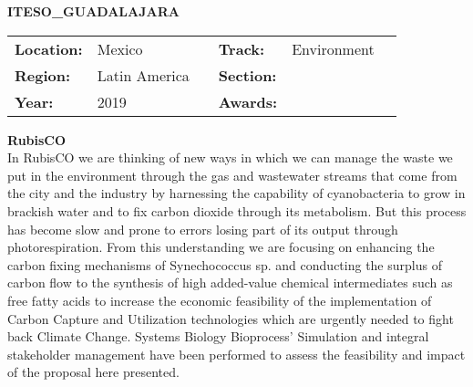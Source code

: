 \textbf{\uppercase{ITESO\_Guadalajara}} \FloatBarrier \begin{table}[h] \begin{tabular}{lp{2.5cm}llll} \textbf{Location:} & Mexico & \multicolumn{1}{|l}{} & \textbf{Track:}   & Environment \\ \textbf{Region:}   & Latin America   & \multicolumn{1}{|l}{} & \textbf{Section:} &  \\ \textbf{Year:}     & 2019   & \multicolumn{1}{|l}{} & \textbf{Awards:}  & \end{tabular} \end{table} \FloatBarrier \noindent\textbf{RubisCO} \vspace{.2cm}\\
In RubisCO we are thinking of new ways in which we can manage the waste we put in the environment through the gas and wastewater streams that come from the city and the industry by harnessing the capability of cyanobacteria to grow in brackish water and to fix carbon dioxide through its metabolism. But this process has become slow and prone to errors losing part of its output through photorespiration. From this understanding we are focusing on enhancing the carbon fixing mechanisms of Synechococcus sp. and conducting the surplus of carbon flow to the synthesis of high added-value chemical intermediates such as free fatty acids to increase the economic feasibility of the implementation of  Carbon Capture and Utilization technologies which are urgently needed to fight back Climate Change. Systems Biology Bioprocess’ Simulation and integral stakeholder management have been performed to assess the feasibility and impact of the proposal here presented.
\vspace{2cm}


